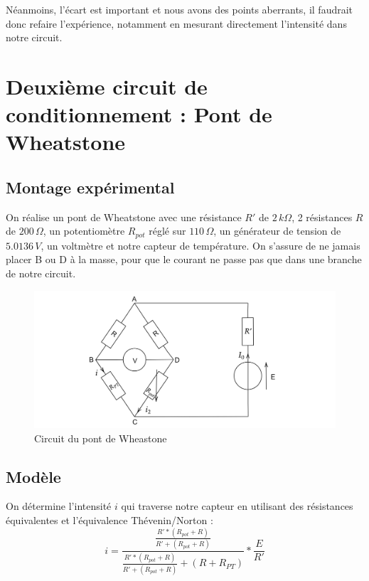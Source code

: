 \documentclass[12pt]{article}
\begin{document}
Néanmoins, l'écart est important et nous avons des points aberrants, il faudrait donc refaire l'expérience, notamment en mesurant directement l'intensité dans notre circuit. 

\section{Deuxième circuit de conditionnement : Pont de Wheatstone}
\subsection{Montage expérimental}

On réalise un pont de Wheatstone avec une résistance $R'$ de $2\, k\Omega$, 2 résistances $R$ de $200\,\Omega$, un potentiomètre $R_{pot}$ réglé sur $110\, \Omega$, un générateur de tension de $5.0136\, V$, un voltmètre et notre capteur de température. On s'assure de ne jamais placer B ou D à la masse, pour que le courant ne passe pas que dans une branche de notre circuit.

\begin{figure}[h!]
	\begin{center}
		\includegraphics[scale=0.1]{Wheatstone.png}
		\caption{Circuit du pont de Wheastone}
		\label{Wheatstone}
	\end{center}
\end{figure}

\subsection{Modèle}

On détermine l'intensité $i$ qui traverse notre capteur en utilisant des résistances équivalentes et l'équivalence Thévenin/Norton :
\begin{equation}
i=\frac{\frac{R'*(R_{pot}+R)}{R'+(R_{pot}+R)}}{\frac{R'*(R_{pot}+R)}{R'+(R_{pot}+R)}+(R+R_{PT})}*\frac{E}{R'}
\label{Intensité_wheatstone}
\end{equation}
\end{document}
